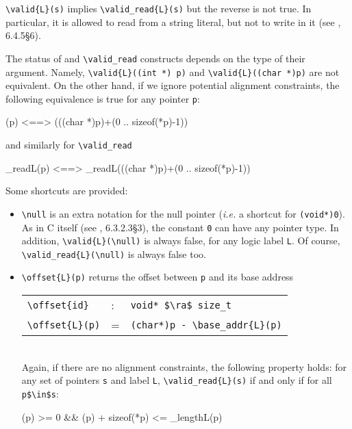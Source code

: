 \lstinline|\valid{L}(s)| implies \lstinline|\valid_read{L}(s)| but the reverse is 
not true. In particular, it is allowed to read from a string literal, but not 
to write in it (see \cite{standardc99}, 6.4.5\S6).

The status of \valid and \lstinline|\valid_read| constructs depends on the
type of their argument. Namely, \lstinline|\valid{L}((int *) p)| and 
\lstinline|\valid{L}((char *)p)| are not equivalent. On the other hand, if we 
ignore potential alignment constraints, the following equivalence is true for any pointer \lstinline|p|:
\begin{listing-nonumber}
(p) <==> (((char *)p)+(0 .. sizeof(*p)-1))
\end{listing-nonumber}
and similarly for \lstinline|\valid_read|
\begin{listing-nonumber}
\valid_read{L}(p) <==> \valid_read{L}(((char *)p)+(0 .. sizeof(*p)-1))
\end{listing-nonumber}

Some shortcuts are provided:
\begin{itemize}
\item \lstinline|\null| is an
  extra notation for the
  null pointer (\emph{i.e.} a shortcut for \lstinline|(void*)0|). 
  As in C itself (see \cite{standardc99}, 6.3.2.3\S3),
  the constant \lstinline|0| can have any pointer type. In addition, 
  \lstinline|\valid{L}(\null)| is always false, for any
  logic label \lstinline|L|.
  Of course, \lstinline|\valid_read{L}(\null)| is always false too.
\item \lstinline|\offset{L}(p)|%
  returns the offset between \lstinline|p| and its base address
\\ \makebox[5mm]{} \begin{tabular}{lll}
    \lstinline|\offset{id}| &:& \lstinline|void* $\ra$ size_t| \\
    \lstinline|\offset{L}(p)| &=& \lstinline|(char*)p - \base_addr{L}(p)| \\
  \end{tabular} \\
Again, if there are no alignment constraints,
  the following property holds: for any set of pointers
\lstinline|s| and label \lstinline|L|, \lstinline|\valid_read{L}(s)| if and only if for all \lstinline|p$\in$s|:
  \begin{listing-nonumber}
    (p) >= 0 && (p) + sizeof(*p) <= \block_length{L}(p)
  \end{listing-nonumber}

\end{itemize}

